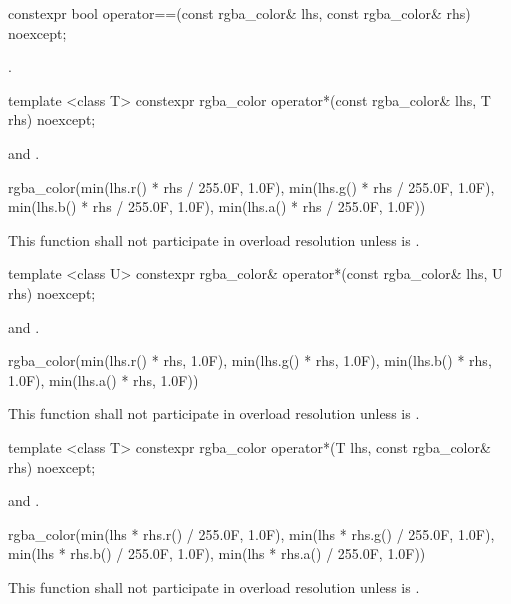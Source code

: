 %
\begin{itemdecl}
constexpr bool operator==(const rgba_color& lhs, const rgba_color& rhs) 
  noexcept;
\end{itemdecl}
\begin{itemdescr}
\pnum
\returns
{}.
\end{itemdescr}

%
\begin{itemdecl}
template <class T>
constexpr rgba_color operator*(const rgba_color& lhs, T rhs) noexcept;
\end{itemdecl}
\begin{itemdescr}
\pnum
\requires
{} and .

\pnum
\returns
\begin{codeblock}
rgba_color(min(lhs.r() * rhs / 255.0F, 1.0F), min(lhs.g() * rhs / 255.0F, 1.0F),
  min(lhs.b() * rhs / 255.0F, 1.0F), min(lhs.a() * rhs / 255.0F, 1.0F))
\end{codeblock}

\pnum
\remarks
This function shall not participate in overload resolution unless  is .
\end{itemdescr}

%
\begin{itemdecl}
template <class U>
constexpr rgba_color& operator*(const rgba_color& lhs, U rhs) noexcept;
\end{itemdecl}
\begin{itemdescr}
\pnum
\requires
{} and .

\pnum
\returns
\begin{codeblock}
rgba_color(min(lhs.r() * rhs, 1.0F), min(lhs.g() * rhs, 1.0F),
  min(lhs.b() * rhs, 1.0F), min(lhs.a() * rhs, 1.0F))
\end{codeblock}

\pnum
\remarks
This function shall not participate in overload resolution unless  is .
\end{itemdescr}

%
\begin{itemdecl}
template <class T>
constexpr rgba_color operator*(T lhs, const rgba_color& rhs) noexcept;
\end{itemdecl}
\begin{itemdescr}
\pnum
\requires
{} and .

\pnum
\returns
\begin{codeblock}
rgba_color(min(lhs * rhs.r() / 255.0F, 1.0F), min(lhs * rhs.g() / 255.0F, 1.0F),
  min(lhs * rhs.b() / 255.0F, 1.0F), min(lhs * rhs.a() / 255.0F, 1.0F))
\end{codeblock}

\pnum
\remarks
This function shall not participate in overload resolution unless  is .
\end{itemdescr}

